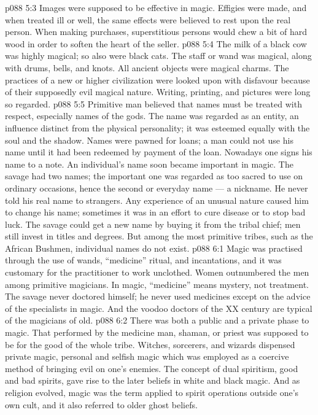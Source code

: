 \vs p088 5:3 Images were supposed to be effective in magic. Effigies were made, and when treated ill or well, the same effects were believed to rest upon the real person. When making purchases, superstitious persons would chew a bit of hard wood in order to soften the heart of the seller.
\vs p088 5:4 The milk of a black cow was highly magical; so also were black cats. The staff or wand was magical, along with drums, bells, and knots. All ancient objects were magical charms. The practices of a new or higher civilization were looked upon with disfavour because of their supposedly evil magical nature. Writing, printing, and pictures were long so regarded.
\vs p088 5:5 Primitive man believed that names must be treated with respect, especially names of the gods. The name was regarded as an entity, an influence distinct from the physical personality; it was esteemed equally with the soul and the shadow. Names were pawned for loans; a man could not use his name until it had been redeemed by payment of the loan. Nowadays one signs his name to a note. An individual’s name soon became important in magic. The savage had two names; the important one was regarded as too sacred to use on ordinary occasions, hence the second or everyday name --- a nickname. He never told his real name to strangers. Any experience of an unusual nature caused him to change his name; sometimes it was in an effort to cure disease or to stop bad luck. The savage could get a new name by buying it from the tribal chief; men still invest in titles and degrees. But among the most primitive tribes, such as the African Bushmen, individual names do not exist.
\vs p088 6:1 Magic was practised through the use of wands, “medicine” ritual, and incantations, and it was customary for the practitioner to work unclothed. Women outnumbered the men among primitive magicians. In magic, “medicine” means mystery, not treatment. The savage never doctored himself; he never used medicines except on the advice of the specialists in magic. And the voodoo doctors of the XX century are typical of the magicians of old.
\vs p088 6:2 There was both a public and a private phase to magic. That performed by the medicine man, shaman, or priest was supposed to be for the good of the whole tribe. Witches, sorcerers, and wizards dispensed private magic, personal and selfish magic which was employed as a coercive method of bringing evil on one’s enemies. The concept of dual spiritism, good and bad spirits, gave rise to the later beliefs in white and black magic. And as religion evolved, magic was the term applied to spirit operations outside one’s own cult, and it also referred to older ghost beliefs.
